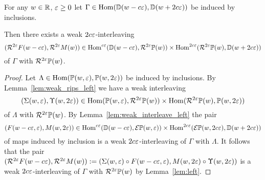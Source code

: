 \begin{lemma}\label{cor:weak_rips_left}
  For any $w\in\R$, $\e \geq 0$ let $\Gamma\in\Hom(\DD(w-c\e), \DD(w+2c\e))$ be induced by inclusions.

  Then there exists a weak $2c\e$-interleaving
  \[ (\rips^{2\e} F(w-c\e), \rips^{2\e} M(w))\in\Hom^{c\e}(\DD(w-c\e),\rips^{2\e}\PP(w))\times \Hom^{2c\e}(\rips^{2\e}\PP(w),\DD(w+2c\e)) \]
  of $\Gamma$ with $\rips^{2\e}\PP(w)$.

\end{lemma}
\begin{proof}
  Let $\Lambda\in\Hom(\PP(w,\e),\PP(w,2\e))$ be induced by inclusions.
  By Lemma~\ref{lem:weak_rips_left} we have a weak interleaving
  \[ (\Sigma(w,\e), \Upsilon(w,2\e))\in \Hom(\PP(w,\e), \rips^{2\e}\PP(w))\times \Hom(\rips^{2\e}\PP(w),\PP(w,2\e))\]
  of $\Lambda$ with $\rips^{2\e}\PP(w)$.
  By Lemma~\ref{lem:weak_interleave_left} the pair
  \[ (F(w-c\e,\e), M(w,2\e))\in\Hom^{c\e}(\DD(w-c\e),\E\PP(w,\e))\times\Hom^{2c\e}(\E\PP(w,2c\e),\DD(w+2c\e))\]
  of maps induced by inclusion is a weak $2c\e$-interleaving of $\Gamma$ with $\Lambda$.
  It follows that the pair $(\rips^{2\e} F(w-c\e), \rips^{2\e} M(w)) := (\Sigma(w,\e)\circ F(w-c\e,\e), M(w,2\e)\circ \Upsilon(w,2\e))$ is a weak $2c\e$-interleaving of $\Gamma$ with $\rips^{2\e}\PP(w)$ by Lemma~\ref{lem:left}.
\end{proof}
%

